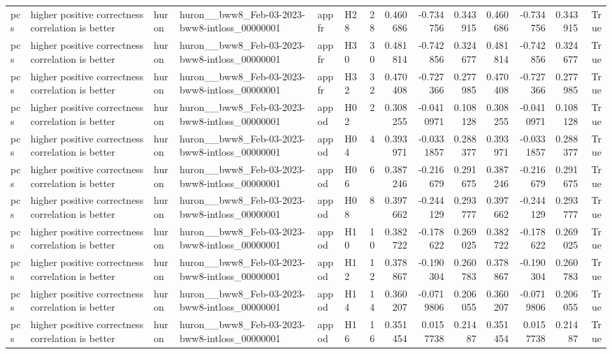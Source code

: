 \begin{longtable}{llllllrrrrrrrr}
pcs & higher positive correctness correlation is better & huron & huron\_\_bww8\_Feb-03-2023-bww8-intloss\_00000001 & appfr & H28 & 28 & 0.460686 & -0.734756 & 0.343915 & 0.460686 & -0.734756 & 0.343915 & True \\
pcs & higher positive correctness correlation is better & huron & huron\_\_bww8\_Feb-03-2023-bww8-intloss\_00000001 & appfr & H30 & 30 & 0.481814 & -0.742856 & 0.324677 & 0.481814 & -0.742856 & 0.324677 & True \\
pcs & higher positive correctness correlation is better & huron & huron\_\_bww8\_Feb-03-2023-bww8-intloss\_00000001 & appfr & H32 & 32 & 0.470408 & -0.727366 & 0.277985 & 0.470408 & -0.727366 & 0.277985 & True \\
pcs & higher positive correctness correlation is better & huron & huron\_\_bww8\_Feb-03-2023-bww8-intloss\_00000001 & appod & H02 & 2 & 0.308255 & -0.0410971 & 0.108128 & 0.308255 & -0.0410971 & 0.108128 & True \\
pcs & higher positive correctness correlation is better & huron & huron\_\_bww8\_Feb-03-2023-bww8-intloss\_00000001 & appod & H04 & 4 & 0.393971 & -0.0331857 & 0.288377 & 0.393971 & -0.0331857 & 0.288377 & True \\
pcs & higher positive correctness correlation is better & huron & huron\_\_bww8\_Feb-03-2023-bww8-intloss\_00000001 & appod & H06 & 6 & 0.387246 & -0.216679 & 0.291675 & 0.387246 & -0.216679 & 0.291675 & True \\
pcs & higher positive correctness correlation is better & huron & huron\_\_bww8\_Feb-03-2023-bww8-intloss\_00000001 & appod & H08 & 8 & 0.397662 & -0.244129 & 0.293777 & 0.397662 & -0.244129 & 0.293777 & True \\
pcs & higher positive correctness correlation is better & huron & huron\_\_bww8\_Feb-03-2023-bww8-intloss\_00000001 & appod & H10 & 10 & 0.382722 & -0.178622 & 0.269025 & 0.382722 & -0.178622 & 0.269025 & True \\
pcs & higher positive correctness correlation is better & huron & huron\_\_bww8\_Feb-03-2023-bww8-intloss\_00000001 & appod & H12 & 12 & 0.378867 & -0.190304 & 0.260783 & 0.378867 & -0.190304 & 0.260783 & True \\
pcs & higher positive correctness correlation is better & huron & huron\_\_bww8\_Feb-03-2023-bww8-intloss\_00000001 & appod & H14 & 14 & 0.360207 & -0.0719806 & 0.206055 & 0.360207 & -0.0719806 & 0.206055 & True \\
pcs & higher positive correctness correlation is better & huron & huron\_\_bww8\_Feb-03-2023-bww8-intloss\_00000001 & appod & H16 & 16 & 0.351454 & 0.0157738 & 0.21487 & 0.351454 & 0.0157738 & 0.21487 & True \\

\end{longtable}
